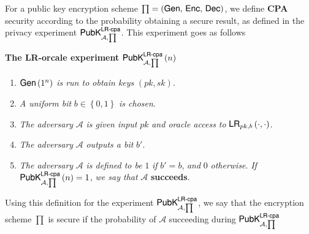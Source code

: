 \documentclass[../CryptoHW3.tex]{subfiles}
\begin{document}
\begin{flushleft}



  For a public key encryption scheme $\prod = \left( \text{{\fontfamily{phv}\selectfont Gen}}, \, \text{{\fontfamily{phv}\selectfont Enc}}, \, \text{{\fontfamily{phv}\selectfont Dec}} \right)$, we define \textbf{CPA} security according to the probability obtaining a secure result, as defined in the privacy experiment $\text{{\fontfamily{phv}\selectfont PubK}}^{\text{{\fontfamily{phv}\selectfont LR-cpa}}}_{\mathcal{A}, \prod}$.  This experiment goes as follows \newline


\textbf{The LR-orcale experiment} $\text{{\fontfamily{phv}\selectfont PubK}}^{\text{{\fontfamily{phv}\selectfont LR-cpa}}}_{\mathcal{A}, \prod} \left( n \right)$

\begin{enumerate}
  \item $\text{{\fontfamily{phv}\selectfont Gen}} \left( 1^n \right)$ \emph{is run to obtain keys} $\left( pk, sk \right)$.
  \item \emph{A uniform bit} $b \in \left\{ 0, 1 \right\}$ \emph{is chosen}.
  \item \emph{The adversary} $\mathcal{A}$ \emph{is given input} $pk$ \emph{and oracle access to} $\text{{\fontfamily{phv}\selectfont LR}}_{pk,b} \left( \cdot , \cdot \right)$.
  \item \emph{The adversary} $\mathcal{A}$ \emph{outputs a bit} $b'$.
  \item \emph{The adversary} $\mathcal{A}$ \emph{is defined to be} $1$ \emph{if} $b' = b$, \emph{and} $0$ \emph{otherwise}.  \emph{If} $\text{{\fontfamily{phv}\selectfont PubK}}^{\text{{\fontfamily{phv}\selectfont LR-cpa}}}_{\mathcal{A}, \prod} \left( n \right) = 1$, \emph{we say that} $\mathcal{A}$ \textbf{succeeds}.
\end{enumerate}

Using this definition for the experiment $\text{{\fontfamily{phv}\selectfont PubK}}^{\text{{\fontfamily{phv}\selectfont LR-cpa}}}_{\mathcal{A}, \prod}$, we say that the encryption scheme $\prod$ is secure if the probability of $\mathcal{A}$ succeeding during $\text{{\fontfamily{phv}\selectfont PubK}}^{\text{{\fontfamily{phv}\selectfont LR-cpa}}}_{\mathcal{A}, \prod}$





























\end{flushleft}
\end{document}
